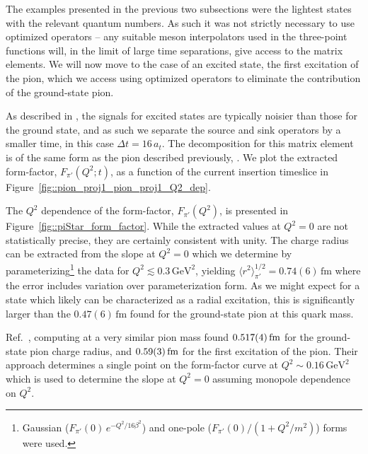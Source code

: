 The examples presented in the previous two subsections were the lightest states with the relevant quantum numbers. As such it was not strictly necessary to use optimized operators -- any suitable meson interpolators used in the three-point functions will, in the limit of large time separations, give access to the matrix elements. We will now move to the case of an excited state, the first excitation of the pion, which we access using optimized operators to eliminate the contribution of the ground-state pion.

As described in , the signals for excited states are typically noisier than those for the ground state, and as such we separate the source and sink operators by a smaller time, in this case $\Delta t = 16 \, a_t$. The decomposition for this matrix element is of the same form as the pion described previously, . We plot the extracted form-factor, $F_{\pi'}(Q^2; t)$, as a function of the current insertion timeslice in Figure~\ref{fig::pion_proj1_pion_proj1_Q2_dep}. 



The $Q^2$ dependence of the form-factor, $F_{\pi'}(Q^2)$, is presented in Figure~\ref{fig::piStar_form_factor}. While the extracted values at $Q^2=0$ are not statistically precise, they are certainly consistent with unity. The charge radius can be extracted from the slope at $Q^2=0$ which we determine by parameterizing\footnote{Gaussian ($F_{\pi'}(0) \, e^{-Q^2/16\beta^2}$) and one-pole ($F_{\pi'}(0) / (1 + Q^2 / m^2 )$) forms were used. }
 the data for $Q^2 \lesssim 0.3\,\mathrm{GeV}^2$, yielding ${   \langle r^2 \rangle_{\pi'}^{1/2} = 0.74(6) \, \mathrm{fm} }$ where the error includes variation over parameterization form. As we might expect for a state which likely can be characterized as a radial excitation, this is significantly larger than the $0.47(6)\,\mathrm{fm}$ found for the ground-state pion at this quark mass. 
 
Ref.~\cite{Owen:2015gva}, computing at a very similar pion mass found $0.517(4)\,{\rm fm}$ for the ground-state pion charge radius, and $0.59(3)\,{\rm fm}$ for the first excitation of the pion. Their approach determines a single point on the form-factor curve at $Q^2\sim 0.16 \,\mathrm{GeV^2}$ which is used to determine the slope at $Q^2=0$ assuming monopole dependence on $Q^2$. 






